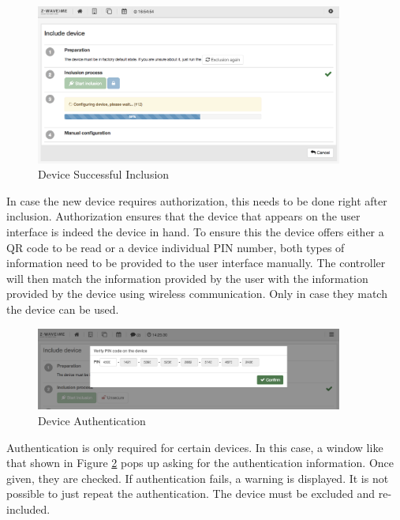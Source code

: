 \begin{figure}
\begin{center}
\includegraphics[width=0.9\textwidth]{pngs/cap4/incl2.png}
\caption{\zwave Device Successful Inclusion}
\label{incl2}
\end{center}
\end{figure}

In case the new device requires authorization, this needs to be done 
right after inclusion.
Authorization ensures that the device that appears on the user interface is indeed the 
device in hand. To ensure this the device offers either a QR code to be read or a 
device individual PIN number, both types of information need to be provided to the user 
interface manually.
The controller will then match the information provided by the user with the information 
provided by the device using wireless communication. Only in case they match the device 
can be used.

\begin{figure}
\begin{center}
\includegraphics[width=0.9\textwidth]{pngs/cap4/SHUI_S2AUTH.png}
\caption{\zwave Device Authentication}
\label{security2_6}
\end{center}
\end{figure}

Authentication is only required for certain devices. In this case, a 
window like that shown in Figure \ref{security2_6} pops up asking for the authentication 
information. Once given, they are checked. If authentication fails, a warning is 
displayed. It is not possible to just repeat the authentication. The 
device must be excluded and re-included.


